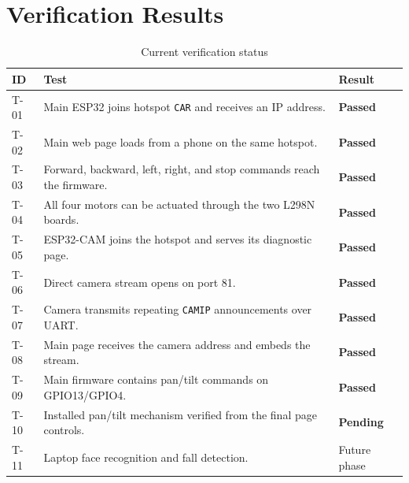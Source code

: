 \documentclass[12pt,a4paper,oneside]{report}
\newcommand{\code}[1]{\texttt{#1}}
\newcommand{\pass}{\textcolor{RoverGreen}{\textbf{Passed}}}
\newcommand{\pending}{\textcolor{RoverRed}{\textbf{Pending}}}
\begin{document}
\section{Verification Results}
\begin{table}[H]
  \centering
  \caption{Current verification status}
  \label{tab:test-results}
  \begin{tabularx}{\textwidth}{p{0.9cm}Yp{2.4cm}}
    \toprule
    \textbf{ID} & \textbf{Test} & \textbf{Result} \\
    \midrule
    T-01 & Main ESP32 joins hotspot \code{CAR} and receives an IP address. & \pass \\
    T-02 & Main web page loads from a phone on the same hotspot. & \pass \\
    T-03 & Forward, backward, left, right, and stop commands reach the firmware. & \pass \\
    T-04 & All four motors can be actuated through the two L298N boards. & \pass \\
    T-05 & ESP32-CAM joins the hotspot and serves its diagnostic page. & \pass \\
    T-06 & Direct camera stream opens on port 81. & \pass \\
    T-07 & Camera transmits repeating \code{CAMIP} announcements over UART. & \pass \\
    T-08 & Main page receives the camera address and embeds the stream. & \pass \\
    T-09 & Main firmware contains pan/tilt commands on GPIO13/GPIO4. & \pass \\
    T-10 & Installed pan/tilt mechanism verified from the final page controls. & \pending \\
    T-11 & Laptop face recognition and fall detection. & Future phase \\
    \bottomrule
  \end{tabularx}
\end{table}
\end{document}
